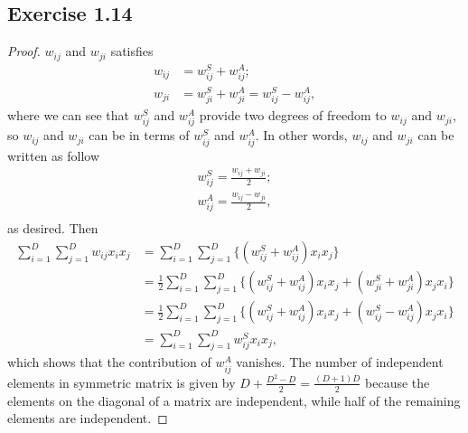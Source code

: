 \documentclass[11pt]{article}
\theoremstyle{definition}
\begin{document}
\subsection{Exercise 1.14}
\begin{proof}
$w_{ij}$ and $w_{ji}$ satisfies
\begin{align*}
    w_{ij} &= w_{ij}^S + w_{ij}^A; \\
    w_{ji} &= w_{ji}^S + w_{ji}^A = w_{ij}^S - w_{ij}^A,
\end{align*}
where we can see that $w_{ij}^S$ and $w_{ij}^A$ provide two degrees of freedom to $w_{ij}$ and $w_{ji}$, so $w_{ij}$ and $w_{ji}$ can be \expressed in terms of $w_{ij}^S$ and $w_{ij}^A$. In other words, $w_{ij}$ and $w_{ji}$ can be written as follow
\begin{align*}
w_{ij}^S = \frac{w_{ij} + w_{ji}}{2};\\
w_{ij}^A = \frac{w_{ij} - w_{ji}}{2},\\
\end{align*}
as desired. Then
\begin{align*}
\sum^D_{i=1}\sum^D_{j=1}w_{ij}x_ix_j &= \sum^D_{i=1}\sum^D_{j=1}\{(w_{ij}^S+w_{ij}^A)x_ix_j\} \\
&= \frac{1}{2}\sum^D_{i=1}\sum^D_{j=1}\{(w_{ij}^S+w_{ij}^A)x_ix_j + (w_{ji}^S+w_{ji}^A)x_jx_i\}\\
&= \frac{1}{2}\sum^D_{i=1}\sum^D_{j=1}\{(w_{ij}^S+w_{ij}^A)x_ix_j + (w_{ij}^S-w_{ij}^A)x_jx_i\}\\
&=\sum^D_{i=1}\sum^D_{j=1}w_{ij}^Sx_ix_j,
\end{align*}
which shows that the contribution of $w_{ij}^A$ vanishes. The number of independent elements in symmetric matrix is given by $D + \frac{D^2-D}{2} = \frac{(D+1)D}{2}$ because the elements on the diagonal of a matrix are independent, while half of the remaining elements are independent.
\end{proof}
\end{document}
